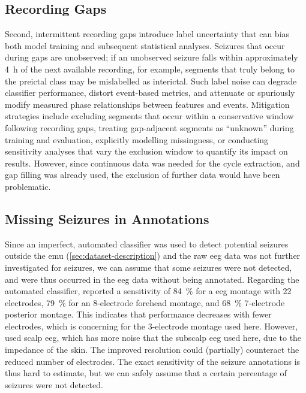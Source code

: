 \subsection{Recording Gaps}
Second, intermittent recording gaps introduce label uncertainty that can bias both model training and subsequent statistical analyses.
Seizures that occur during gaps are unobserved; if an unobserved seizure falls within approximately \SI{4}{\hour} of the next available recording, for example, segments that truly belong to the preictal class may be mislabelled as interictal.
Such label noise can degrade classifier performance, distort event-based metrics, and attenuate or spuriously modify measured phase relationships between features and events.
Mitigation strategies include excluding segments that occur within a conservative window following recording gaps, treating gap-adjacent segments as ``unknown'' during training and evaluation, explicitly modelling missingness, or conducting sensitivity analyses that vary the exclusion window to quantify its impact on results.
However, since continuous data was needed for the cycle extraction, and gap filling was already used, the exclusion of further data would have been problematic.

\subsection{Missing Seizures in Annotations}
Since an imperfect, automated classifier was used to detect potential seizures outside the \gls{emu} (\cref{sec:dataset-description}) and the raw \gls{eeg} data was not further investigated for seizures, we can assume that some seizures were not detected, and were thus occurred in the \gls{eeg} data without being annotated.
Regarding the automated classifier, \textcite{furbass_automatic_2017} reported a sensitivity of \SI{84}{\percent} for a \gls{eeg} montage with 22 electrodes, \SI{79}{\percent} for an 8-electrode forehead montage, and \SI{68}{\percent} 7-electrode posterior montage.
This indicates that performance decreases with fewer electrodes, which is concerning for the 3-electrode montage used here.
However, \textcite{furbass_automatic_2017} used scalp \gls{eeg}, which has more noise that the subscalp \gls{eeg} used here, due to the impedance of the skin.
The improved resolution could (partially) counteract the reduced number of electrodes.
The exact sensitivity of the seizure annotations is thus hard to estimate, but we can safely assume that a certain percentage of seizures were not detected.

